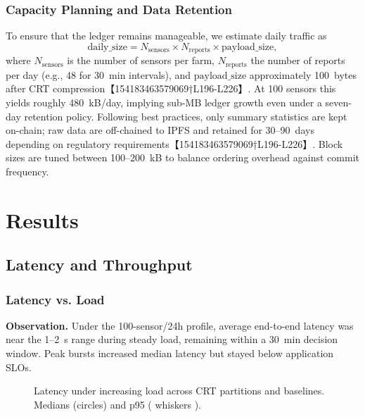 \subsubsection{Capacity Planning and Data Retention}
To ensure that the ledger remains manageable, we estimate daily traffic as
\begin{equation}
  \text{daily\_size} = N_{\text{sensors}} \times N_{\text{reports}} \times \text{payload\_size},
\end{equation}
where $N_{\text{sensors}}$ is the number of sensors per farm, $N_{\text{reports}}$ the number of reports per day (e.g., 48 for 30~min intervals), and $\text{payload\_size}$ approximately 100~bytes after CRT compression【154183463579069†L196-L226】.  At 100 sensors this yields roughly 480~kB/day, implying sub-MB ledger growth even under a seven-day retention policy.  Following best practices, only summary statistics are kept on-chain; raw data are off-chained to IPFS and retained for 30–90~days depending on regulatory requirements【154183463579069†L196-L226】.  Block sizes are tuned between 100–200~kB to balance ordering overhead against commit frequency.

\section{Results}

\subsection{Latency and Throughput}

\subsubsection{Latency vs. Load}
\textbf{Observation.} Under the 100-sensor/24h profile, average end-to-end latency was near the 1–2~s range during steady load, remaining within a 30~min decision window. Peak bursts increased median latency but stayed below application SLOs.\ %
\begin{figure}[!t]
  \centering
  \caption{Latency under increasing load across CRT partitions and baselines. Medians (circles) and p95 ( whiskers ).}
  \label{fig:latency-load}
\end{figure}

